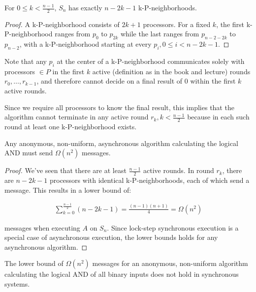 \begin{lemma} \label{lemma:nrkpneighborhoods}
For $0 \leq k < \frac{n-1}{2}$, $S_n$ has exactly $n-2k-1$ k-P-neighborhoods.
\end{lemma}

\begin{proof}
A k-P-neighborhood consists of $2k + 1$ processors. For a fixed $k$, the first
k-P-neighborhood ranges from $p_0$ to $p_{2k}$ while the last ranges from $p_{n-2-2k}$
to $p_{n-2}$, with a k-P-neighborhood starting at every $p_i, 0 \leq i < n - 2k - 1$.
\end{proof}

Note that any $p_i$ at the center of a k-P-neighborhood communicates solely with
processors $\in P$ in the first $k$ active (definition as in the book and lecture)
rounds $r_0, \ldots, r_{k-1}$, and therefore cannot decide on a final result of $0$ within the first $k$
active rounds.

Since we require all processors to know the final result, this implies that the
algorithm cannot terminate in any active round $r_k, k < \frac{n-1}{2}$ because
in each such round at least one k-P-neighborhood exists.


\begin{theorem}
Any anonymous, non-uniform, asynchronous algorithm calculating the logical AND
must send $\Omega(n^2)$ messages.
\end{theorem}

\begin{proof}
We've seen that there are at least $\frac{n-1}{2}$ active rounds. In round $r_k$,
there are $n-2k-1$ processors with identical k-P-neighborhoods, each of which
send a message. This results in a lower bound of:

\begin{align}
\sum_{k = 0}^{\frac{n-1}{2}} (n-2k-1) = \frac{(n-1)(n+1)}{4} = \Omega(n^2)
\end{align}

messages when executing $A$ on $S_n$. Since lock-step synchronous execution
is a special case of asynchronous execution, the lower bounds holds for
any asynchronous algorithm.
\end{proof}


\begin{theorem}
The lower bound of $\Omega(n^2)$ messages for an anonymous, non-uniform algorithm calculating the
logical AND of all binary inputs does not hold in synchronous systems.
\end{theorem}

